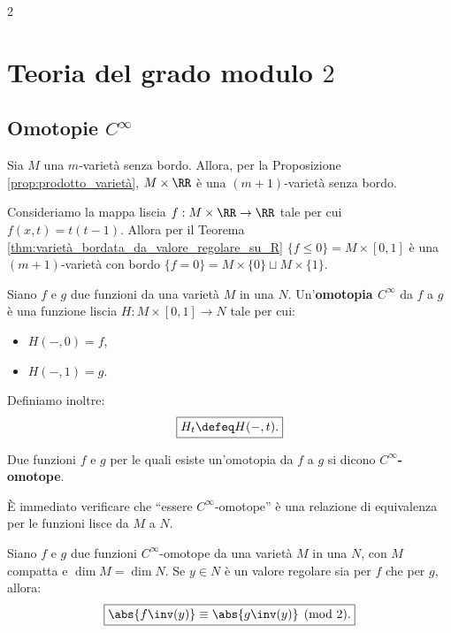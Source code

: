 \begin{multicols*}{2}
    \section{Teoria del grado modulo \texorpdfstring{$2$}{2}}

    \subsection{Omotopie \texorpdfstring{$C^\infty$}{C∞}}

    \begin{remark} \label{rmk:m_01_varietà}
        Sia $M$ una $m$-varietà senza bordo. Allora, per la Proposizione \ref{prop:prodotto_varietà},
        $M \times \RR$ è una $(m+1)$-varietà senza bordo. \smallskip

        Consideriamo la mappa liscia $f : M \times \RR \to \RR$ tale per cui
        $f(x, t) = t(t-1)$. Allora per il Teorema \ref{thm:varietà_bordata_da_valore_regolare_su_R}
        $\{f \leq 0\} = M \times [0, 1]$ è una $(m+1)$-varietà con bordo
        $\{f = 0\} = M \times \{0\} \sqcup M \times \{1\}$.
    \end{remark}

    \begin{definition}
        Siano $f$ e $g$ due funzioni da una varietà $M$ in una $N$.
        Un'\textbf{omotopia $C^\infty$} da $f$ a $g$ è una funzione liscia
        $H : M \times [0, 1] \to N$ tale per cui:
        \begin{itemize}
            \item $H(-, 0) = f$,
            \item $H(-, 1) = g$.
        \end{itemize}
        Definiamo inoltre:
        \[
            \boxed{H_t \defeq H(-, t).}
        \]

        Due funzioni $f$ e $g$ per le quali esiste un'omotopia
        da $f$ a $g$ si dicono \textbf{$C^\infty$-omotope}.
    \end{definition}

    \begin{remark}
        È immediato verificare che ``essere $C^\infty$-omotope'' è una
        relazione di equivalenza per le funzioni lisce da $M$ a $N$.
    \end{remark}

    \begin{lemma}[di omotopia] \label{lem:omotopia}
        Siano $f$ e $g$ due funzioni $C^\infty$-omotope da una varietà $M$ in una $N$,
        con $M$ compatta e $\dim M = \dim N$. Se
        $y \in N$ è un valore regolare sia per $f$ che per $g$, allora:
        \[
            \boxed{\abs{f\inv(y)} \equiv \abs{g\inv(y)} \pmod{2}.}
        \]
    \end{lemma}


\end{multicols*}
